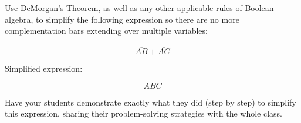 

Use DeMorgan's Theorem, as well as any other applicable rules of Boolean algebra, to simplify the following expression so there are no more complementation bars extending over multiple variables:

$$\overline{ \overline{AB} + \overline{AC} }$$







Simplified expression:

$$ABC$$







Have your students demonstrate exactly what they did (step by step) to simplify this expression, sharing their problem-solving strategies with the whole class.





